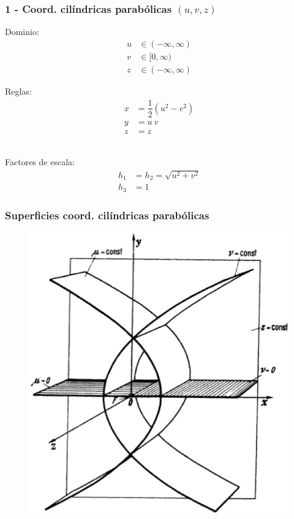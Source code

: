 \documentclass[12pt]{beamer}
\begin{document}
\begin{frame}
\frametitle{1 - Coord. cilíndricas parabólicas $(u, v, z)$}
\setlength{\abovedisplayskip}{-1pt}
\fontsize{12}{12}\selectfont
\begin{minipage}[t]{0.45\textwidth}
Dominio:
\begin{align*}
u &\in (-\infty, \infty) \\
v &\in [0, \infty) \\
z &\in (-\infty, \infty)
\end{align*}
\end{minipage}
\hspace{1cm}
\pause
\begin{minipage}[t]{0.4\textwidth}
Reglas:
\begin{align*}
x &= \dfrac{1}{2}(u^{2 } -v^{2}) \\
y &= u \: v \\
z &= z
\end{align*}
\end{minipage}%
\\[0.75em]
\pause
Factores de escala:
\begin{align*}
h_{1 } &= h_{2} = \sqrt{u^{2} +v^{2}} \\
h_{3 } &= 1
\end{align*}
\end{frame}
\begin{frame}
\frametitle{Superficies coord. cilíndricas parabólicas}
\begin{figure}[H]
  \centering
  \includegraphics[scale=0.3]{Imagenes/Sistema_Cilindrico_Parabolico.eps}
\end{figure}
\end{frame}
\end{document}
